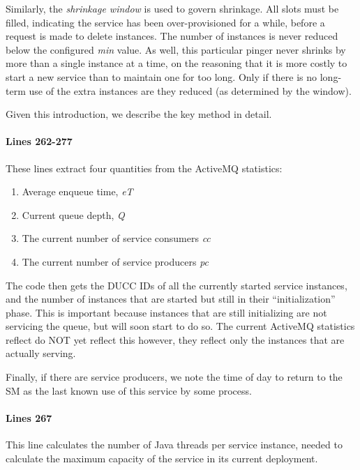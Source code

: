     Similarly, the {\em shrinkage window} is used to govern shrinkage.  All slots must be
    filled, indicating the service has been over-provisioned for a while, before a request
    is made to delete instances.  The number of instances is never reduced below the
    configured {\em min} value.  As well, this particular pinger never shrinks by more than
    a single instance at a time, on the reasoning that it is more costly to start a new
    service than to maintain one for too long.  Only if there is no long-term use of 
    the extra instances are they reduced (as
    determined by the window).

    Given this introduction, we describe the key method in detail.

    \paragraph{Lines 262-277}
    These lines extract four quantities from the ActiveMQ statistics:
    \begin{enumerate}
      \item Average enqueue time, {\em eT}
      \item Current queue depth, {\em Q}
      \item The current number of service consumers {\em cc}
      \item The current number of service producers {\em pc}
    \end{enumerate}

    The code then gets the DUCC IDs of all the currently started service
    instances, and the number of instances that are started but still in
    their ``initialization'' phase.  This is important because instances that
    are still initializing are not servicing the queue, but will soon start
    to do so.  The current ActiveMQ statistics reflect do NOT yet reflect
    this however, they reflect only the instances that are actually serving.

    Finally, if there are service producers, we note the time of day to
    return to the SM as the last known use of this service by some process.

    \paragraph{Lines 267}
    This line calculates the number of Java threads per service instance, needed to calculate the
    maximum capacity of the service in its current deployment.

